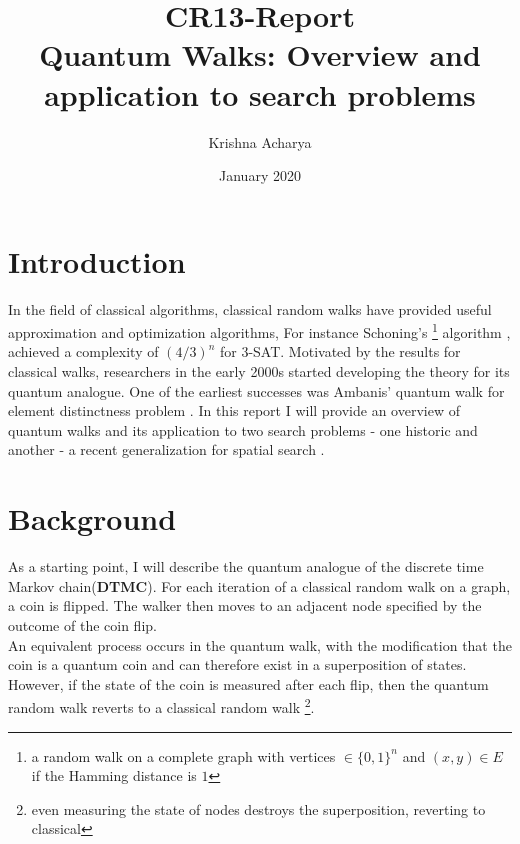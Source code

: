 \documentclass{article}
\title{CR13-Report\\
\textbf{Quantum Walks: Overview and application to search problems}}
\author{Krishna Acharya}
\date{January 2020}
\begin{document}
\maketitle

\section{Introduction}
In the field of classical algorithms, classical random walks have provided useful approximation and optimization algorithms, For instance Schoning's \cite{Schoning1999APA} \footnote{a random walk on a complete graph with vertices $\in \{0,1\}^n$ and $(x,y)\in E$ if the Hamming distance is $1$} algorithm , achieved a complexity of $(4/3)^n$ for $3$-SAT. Motivated by the results for classical walks,  researchers in the early 2000s started developing the theory for its quantum analogue. One of the earliest successes was Ambanis' quantum walk for element distinctness problem  \cite{Ambainis2003QuantumWA}. In this report I will provide an overview of quantum walks\cite{Kempe2003QuantumRW} and its application to two search problems - one historic \cite{Shenvi2003QuantumRS} and another - a recent generalization for spatial search \cite{Ambainis2019QuadraticSF}.

\section{Background}
As a starting point, I will describe the quantum analogue of the discrete time Markov chain(\textbf{DTMC}).
For each iteration of a classical random walk on a graph, a coin is flipped. The walker then moves to an adjacent node specified by the outcome of the coin flip.\\ An equivalent process occurs in the quantum walk, with the modification that the coin is a quantum coin and can therefore exist in a superposition of states. However, if the state of the coin is measured after each flip, then the quantum random walk reverts to
a classical random walk \footnote{even measuring the state of nodes destroys the superposition, reverting to classical}.
\end{document}
